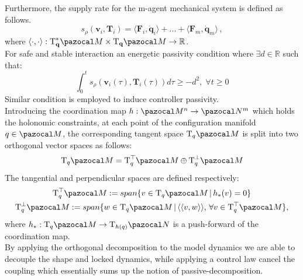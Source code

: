 Furthermore, the supply rate for the m-agent mechanical system is defined as follows.
\begin{equation}
	s_\rho(\textbf{v}_i, \textbf{T}_i) = \langle\textbf{F}_i, \dot{\textbf{q}}_i \rangle + ... + \langle\textbf{F}_m, \dot{\textbf{q}}_m \rangle \, ,
\end{equation}
where $\langle \cdot, \cdot \rangle: \text{T}_{\textbf{q}}^*\Ma \times \text{T}_{\textbf{q}}\Ma  \rightarrow \mathbb{R}$. \\
\noindent For safe and stable interaction an energetic passivity condition where $\exists d\in\mathbb{R}$ such that: 
\begin{equation}
	 \int_{0}^{t}	s_\rho(\textbf{v}_i(\tau), \textbf{T}_i(\tau))d\tau \geq -d^2, \;\forall t\geq 0
\end{equation}
Similar condition is employed to induce controller passivity. \\
Introducing the coordination map $h:\Ma^n \rightarrow \Na^m$ which holds the holonomic constraints, at each point of the configuration manifold $q\in\Ma$, the corresponding tangent space $\text{T}_q\Ma$
is split into two orthogonal vector spaces as follows:
\begin{equation}
	\text{T}_q\Ma = \text{T}_q^\top \Ma \oplus \text{T}_q^{\perp} \Ma
\end{equation}
The tangential and perpendicular spaces are defined respectively:
\begin{gather}
	\text{T}_q^\top\Ma := span \{v \in \text{T}_q\Ma \, \vert \, h_*(v) = 0\}  \\
	\text{T}_q^\perp\Ma := span \{w \in \text{T}_q\Ma \, \vert \, \langle \langle v, w \rangle \rangle, \, \forall v \in \text{T}_q^\top \Ma  \}, 
\end{gather}
where $h_*: \text{T}_q\Ma \rightarrow \text{T}_{h(q)}\Na$ is a push-forward of the coordination map. \\
By applying the orthogonal decomposition to the model dynamics we are able to decouple the shape and locked dynamics, while applying a control law cancel the coupling which essentially sums up the notion of passive-decomposition.

